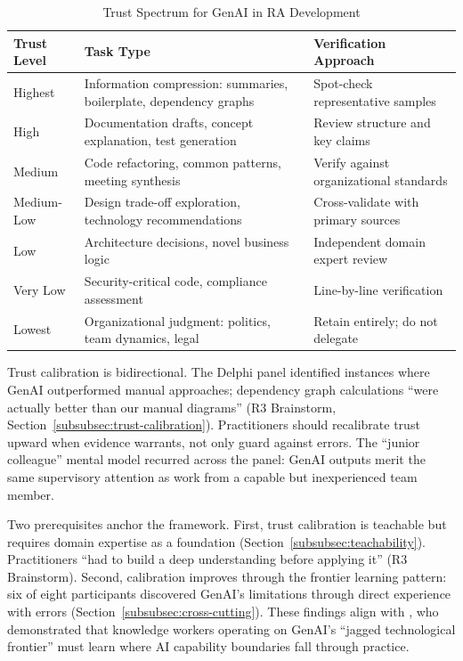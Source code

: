 \begin{table}[!ht]
    \centering
    \caption{Trust Spectrum for GenAI in RA Development}\label{tab:trust-spectrum}
    \begin{tabular}{|p{2.5cm}|p{5.5cm}|p{5.5cm}|}
        \hline
        \textbf{Trust Level} & \textbf{Task Type} & \textbf{Verification Approach} \\
        \hline
        Highest & Information compression: summaries, boilerplate, dependency graphs & Spot-check representative samples \\
        \hline
        High & Documentation drafts, concept explanation, test generation & Review structure and key claims \\
        \hline
        Medium & Code refactoring, common patterns, meeting synthesis & Verify against organizational standards \\
        \hline
        Medium-Low & Design trade-off exploration, technology recommendations & Cross-validate with primary sources \\
        \hline
        Low & Architecture decisions, novel business logic & Independent domain expert review \\
        \hline
        Very Low & Security-critical code, compliance assessment & Line-by-line verification \\
        \hline
        Lowest & Organizational judgment: politics, team dynamics, legal & Retain entirely; do not delegate \\
        \hline
    \end{tabular}
\end{table}

Trust calibration is bidirectional. The Delphi panel identified instances where
GenAI outperformed manual approaches; dependency graph calculations ``were
actually better than our manual diagrams'' (R3 Brainstorm,
Section~\ref{subsubsec:trust-calibration}). Practitioners should recalibrate
trust upward when evidence warrants, not only guard against errors. The ``junior
colleague'' mental model recurred across the panel: GenAI outputs merit the same
supervisory attention as work from a capable but inexperienced team member.

Two prerequisites anchor the framework. First, trust calibration is teachable but
requires domain expertise as a foundation
(Section~\ref{subsubsec:teachability}). Practitioners ``had to build a deep
understanding before applying it'' (R3 Brainstorm). Second, calibration improves
through the frontier learning pattern: six of eight participants discovered
GenAI's limitations through direct experience with errors
(Section~\ref{subsubsec:cross-cutting}). These findings align with
\textcite{dellacqua_navigating_2023}, who demonstrated that knowledge workers
operating on GenAI's ``jagged technological frontier'' must learn where AI
capability boundaries fall through practice.

